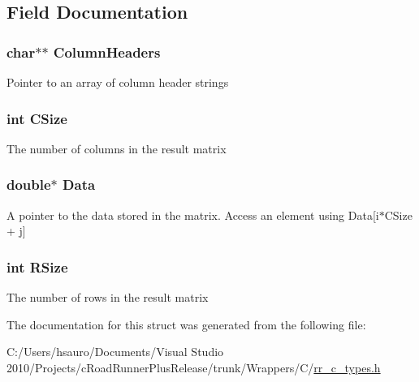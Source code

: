 \subsection{\-Field \-Documentation}
\hypertarget{struct_r_r_result_ab339159e5604808f92fe793f4f43da03}{
\subsubsection[{\-Column\-Headers}]{\setlength{\rightskip}{0pt plus 5cm}char$\ast$$\ast$ {\bf \-Column\-Headers}}}
\label{struct_r_r_result_ab339159e5604808f92fe793f4f43da03}
\-Pointer to an array of column header strings \hypertarget{struct_r_r_result_a17c9a5894aa9cb3789346dcaa9c370bb}{
\subsubsection[{\-C\-Size}]{\setlength{\rightskip}{0pt plus 5cm}int {\bf \-C\-Size}}}
\label{struct_r_r_result_a17c9a5894aa9cb3789346dcaa9c370bb}
\-The number of columns in the result matrix \hypertarget{struct_r_r_result_a7c5cbda3aa940f4b0d6e8a1679307dfc}{
\subsubsection[{\-Data}]{\setlength{\rightskip}{0pt plus 5cm}double$\ast$ {\bf \-Data}}}
\label{struct_r_r_result_a7c5cbda3aa940f4b0d6e8a1679307dfc}
\-A pointer to the data stored in the matrix. \-Access an element using \-Data\mbox{[}i$\ast$\-C\-Size + j\mbox{]} \hypertarget{struct_r_r_result_a4d8512c879223c0e0d1522dae38e7819}{
\subsubsection[{\-R\-Size}]{\setlength{\rightskip}{0pt plus 5cm}int {\bf \-R\-Size}}}
\label{struct_r_r_result_a4d8512c879223c0e0d1522dae38e7819}
\-The number of rows in the result matrix 

\-The documentation for this struct was generated from the following file\-:\begin{DoxyCompactItemize}
\item 
\-C\-:/\-Users/hsauro/\-Documents/\-Visual Studio 2010/\-Projects/c\-Road\-Runner\-Plus\-Release/trunk/\-Wrappers/\-C/\hyperlink{rr__c__types_8h}{rr\-\_\-c\-\_\-types.\-h}\end{DoxyCompactItemize}
